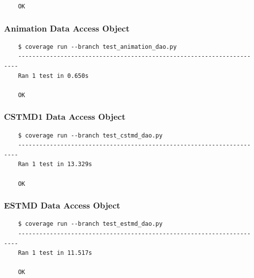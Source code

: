 \documentclass[a4paper,11pt]{article}
\begin{document}
\begin{appendices}
\begin{verbatim}
    OK
\end{verbatim} 
    
\subsubsection*{{\hspace{6mm}}Animation Data Access Object}
\begin{verbatim}
    $ coverage run --branch test_animation_dao.py
    ----------------------------------------------------------------------
    Ran 1 test in 0.650s

    OK
\end{verbatim}

\subsubsection*{{\hspace{6mm}}CSTMD1 Data Access Object}
\begin{verbatim}
    $ coverage run --branch test_cstmd_dao.py
    ----------------------------------------------------------------------
    Ran 1 test in 13.329s

    OK
\end{verbatim}
  
\subsubsection*{{\hspace{6mm}}ESTMD Data Access Object}
\begin{verbatim}
    $ coverage run --branch test_estmd_dao.py
    ----------------------------------------------------------------------
    Ran 1 test in 11.517s

    OK
\end{verbatim}  
\end{appendices}
\end{document}
